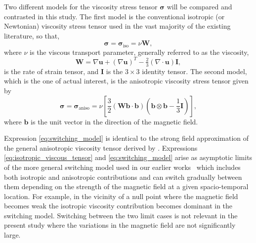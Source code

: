 \documentclass[fleqn,usenatbib]{mnras}
\newcommand{\revcite}[1]{{\color{red} \underline{#1}}}
\newcommand{\ten}[1]{{\bm #1}}
\renewcommand{\vec}[1]{{\bm #1}}
\begin{document}
Two different models for the viscosity stress tensor $\ten{\sigma}$ will be
compared and contrasted in this study. The first model is the conventional
isotropic (or Newtonian) viscosity stress tensor used in the vast majority of
the existing literature, so that, 
\begin{equation}
  \label{eq:isotropic_viscous_tensor}
\ten{\sigma = }\ten{\sigma}_{\text{iso}} = \nu \ten{W},
\end{equation}
where $\nu$ is the viscous transport parameter, generally referred to as the
viscosity,
\begin{equation}
  \label{eq:rate_of_strain}
  \ten{W} = \nabla\vec{u} + (\nabla\vec{u})^T - \tfrac{2}{3}(\nabla \cdot \vec{u})\ten{I},
\end{equation}
is the rate of strain tensor, and $\ten{I}$ is the  $3\times 3$ identity
tensor. The second model, which is the one of actual interest, is the
anisotropic viscosity stress tensor given by
\begin{equation}
  \label{eq:switching_model}
\ten{\sigma} = \ten{\sigma}_\text{aniso} = \nu \left[\frac{3}{2}(\ten{W}\vec{b}\cdot\vec{b}) \left( \vec{b} \otimes \vec{b} - \frac{1}{3}\ten{I} \right)\right],
\end{equation}
where $\vec{b}$ is the unit vector in the direction of the magnetic
field.

Expression \eqref{eq:switching_model} is identical to the strong field
approximation of the general anisotropic viscosity tensor derived
by \revcite{\citet{braginskiiTransportProcessesPlasma1965}}. Expressions
\eqref{eq:isotropic_viscous_tensor} and \eqref{eq:switching_model} arise as
asymptotic limits of the more general switching model used in our earlier works~\citep{mactaggartBraginskiiMagnetohydrodynamicsArbitrary2017,quinnEffectAnisotropicViscosity2020,quinnKelvinHelmholtzInstabilityCollapse2021}
which includes both isotropic and anisotropic contributions and can switch
gradually between them depending on the strength of the magnetic field at
a given spacio-temporal location. For example, in the vicinity of a null point
where the magnetic field becomes weak the isotropic viscosity contribution
becomes dominant in the switching model. Switching between the two limit cases
is not relevant in the present study where the variations in the magnetic field
are not significantly large.
\end{document}
